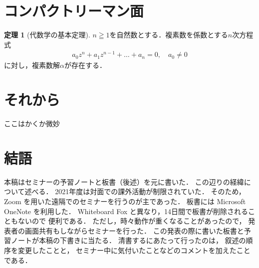 \documentclass[11pt, a4paper, dvipdfmx, draft]{jsarticle}
\theoremstyle{definition}
\newtheorem{Theorem}[Axiom]{定理}
\theoremstyle{mystyle}
\numberwithin{equation}{section} %
\begin{document}
\section{コンパクトリーマン面}

\begin{Theorem}[代数学の基本定理{\cite[系2.24]{ogs}}]
    $n\geqq1$を自然数とする．複素数を係数とする$n$次方程式
    \begin{align*}
        a_{0}z^{n}+a_{1}z^{n-1}+\dots +a_{n}=0,\quad a_{0}\neq 0
    \end{align*}
    に対し，複素数解$\alpha$が存在する．
\end{Theorem}

\section{それから}
ここはかくか微妙
\section{結語}
本稿はセミナーの予習ノートと板書（後述）を元に書いた．
この辺りの経緯について述べる．
2021年度は対面での課外活動が制限されていた．
そのため，Zoom を用いた遠隔でのセミナーを行うのが主であった．
板書には Microsoft OneNote を利用した．
Whiteboard Fox と異なり，14日間で板書が削除されることもないので
便利である．
ただし，時々動作が重くなることがあったので，
発表者の画面共有もしながらセミナーを行った．
この発表の際に書いた板書と予習ノートが本稿の下書きに当たる．
清書するにあたって行ったのは，
叙述の順序を変更したことと，
セミナー中に気付いたことなどのコメントを加えたことである．
\end{document}

